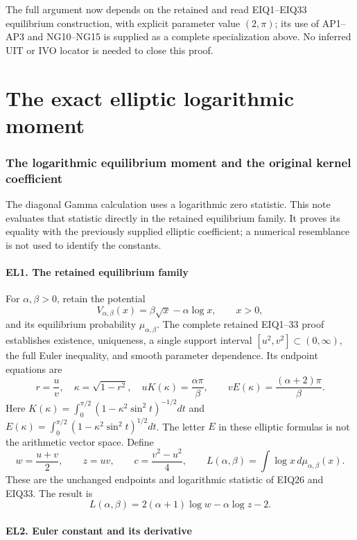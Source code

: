 \documentclass[10pt]{article}
\begin{document}
The full argument now depends on the retained and read EIQ1--EIQ33 equilibrium construction, with explicit parameter value \((2,\pi)\); its use of AP1--AP3 and NG10--NG15 is supplied as a complete specialization above. No inferred UIT or IVO locator is needed to close this proof.

\clearpage\part{The exact elliptic logarithmic moment}
\section{The logarithmic equilibrium moment and the original kernel coefficient}\label{the-logarithmic-equilibrium-moment-and-the-original-kernel-coefficient}

The diagonal Gamma calculation uses a logarithmic zero statistic. This note evaluates that statistic directly in the retained equilibrium family. It proves its equality with the previously supplied elliptic coefficient; a numerical resemblance is not used to identify the constants.

\subsection{EL1. The retained equilibrium family}\label{el1.-the-retained-equilibrium-family}

For \(\alpha,\beta>0\), retain the potential \[
 V_{\alpha,\beta}(x)=\beta\sqrt{x}-\alpha\log x,\qquad x>0,
\] and its equilibrium probability \(\mu_{\alpha,\beta}\). The complete retained EIQ1--33 proof establishes existence, uniqueness, a single support interval \([u^2,v^2]\subset(0,\infty)\), the full Euler inequality, and smooth parameter dependence. Its endpoint equations are \[
 r=\frac uv,\quad\kappa=\sqrt{1-r^2},\quad
 uK(\kappa)=\frac{\alpha\pi}{\beta},\qquad
 vE(\kappa)=\frac{(\alpha+2)\pi}{\beta}.
 \tag{EL1}
\] Here \(K(\kappa)=\int_0^{\pi/2}(1-\kappa^2\sin^2t)^{-1/2}dt\) and \(E(\kappa)=\int_0^{\pi/2}(1-\kappa^2\sin^2t)^{1/2}dt\). The letter \(E\) in these elliptic formulas is not the arithmetic vector space. Define \[
 w=\frac{u+v}{2},\qquad z=uv,\qquad c=\frac{v^2-u^2}{4},\qquad
 L(\alpha,\beta)=\int\log x\,d\mu_{\alpha,\beta}(x).
 \tag{EL2}
\] These are the unchanged endpoints and logarithmic statistic of EIQ26 and EIQ33. The result is \[
 \boxed{L(\alpha,\beta)=2(\alpha+1)\log w-\alpha\log z-2.}
 \tag{EL3}
\]

\subsection{EL2. Euler constant and its derivative}\label{el2.-euler-constant-and-its-derivative}
\end{document}

